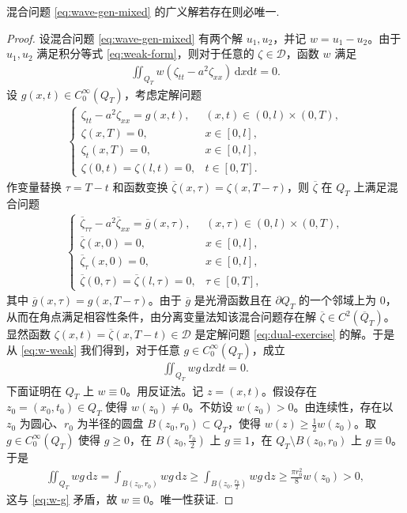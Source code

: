 \documentclass[../../main.tex]{subfiles}%
\begin{document}
\begin{theorem}
混合问题 \eqref{eq:wave-gen-mixed} 
的广义解若存在则必唯一.
\end{theorem}
\begin{proof}
设混合问题 \eqref{eq:wave-gen-mixed} 有两个解 $u_1,u_2$，并记 $w=u_1-u_2$。由于 $u_1,u_2$ 满足积分等式 \eqref{eq:weak-form}，则对于任意的 $\zeta\in\mathcal{D}$，函数 $w$ 满足
\begin{align}
\iint_{Q_T}w(\zeta_{tt}-a^2\zeta_{xx})\,\mathrm{d}x\mathrm{d}t=0. \label{eq:w-weak}
\end{align}
设 $g(x,t)\in C_0^\infty(Q_T)$，考虑定解问题
\begin{align}
\begin{cases}
\zeta_{tt}-a^2\zeta_{xx}=g(x,t), & (x,t)\in(0,l)\times(0,T), \\
\zeta(x,T)=0, & x\in[0,l], \\
\zeta_t(x,T)=0, & x\in[0,l], \\
\zeta(0,t)=\zeta(l,t)=0, & t\in[0,T].
\end{cases} \label{eq:dual-exercise}
\end{align}
作变量替换 $\tau=T-t$ 和函数变换 $\overline{\zeta}(x,\tau)=\zeta(x,T-\tau)$，则 $\overline{\zeta}$ 在 $Q_T$ 上满足混合问题
\begin{align*}
\begin{cases}
\overline{\zeta}_{\tau\tau}-a^2\overline{\zeta}_{xx}=\overline{g}(x,\tau), & (x,\tau)\in(0,l)\times(0,T), \\
\overline{\zeta}(x,0)=0, & x\in[0,l], \\
\overline{\zeta}_\tau(x,0)=0, & x\in[0,l], \\
\overline{\zeta}(0,\tau)=\overline{\zeta}(l,\tau)=0, & \tau\in[0,T],
\end{cases}
\end{align*}
其中 $\overline{g}(x,\tau)=g(x,T-\tau)$。由于 $\overline{g}$ 是光滑函数且在 $\partial Q_T$ 的一个邻域上为 $0$，从而在角点满足相容性条件，由分离变量法知该混合问题存在解 $\overline{\zeta}\in C^2(\overline{Q}_T)$。显然函数 $\zeta(x,t)=\overline{\zeta}(x,T-t)\in\mathcal{D}$ 是定解问题 \eqref{eq:dual-exercise} 的解。于是从 \eqref{eq:w-weak} 我们得到，对于任意 $g\in C_0^\infty(Q_T)$，成立
\begin{align}
\iint_{Q_T}wg\,\mathrm{d}x\mathrm{d}t=0. \label{eq:w-g}
\end{align}
下面证明在 $Q_T$ 上 $w\equiv 0$。用反证法。记 $z=(x,t)$。假设存在 $z_0=(x_0,t_0)\in Q_T$ 使得 $w(z_0)\neq 0$。不妨设 $w(z_0)>0$。由连续性，存在以 $z_0$ 为圆心、$r_0$ 为半径的圆盘 $B(z_0,r_0)\subset Q_T$，使得 $w(z)\geqslant \frac{1}{2}w(z_0)$。取 $g\in C_0^\infty(Q_T)$ 使得 $g\geqslant 0$，在 $B(z_0,\frac{r_0}{2})$ 上 $g\equiv 1$，在 $Q_T\setminus B(z_0,r_0)$ 上 $g\equiv 0$。于是
\begin{align*}
\iint_{Q_T}wg\,\mathrm{d}z
=\int_{B(z_0,r_0)}wg\,\mathrm{d}z
\geqslant \int_{B(z_0,\frac{r_0}{2})}wg\,\mathrm{d}z
\geqslant \frac{\pi r_0^2}{8}w(z_0)>0,
\end{align*}
这与 \eqref{eq:w-g} 矛盾，故 $w\equiv 0$。唯一性获证.
\end{proof}
\end{document}
